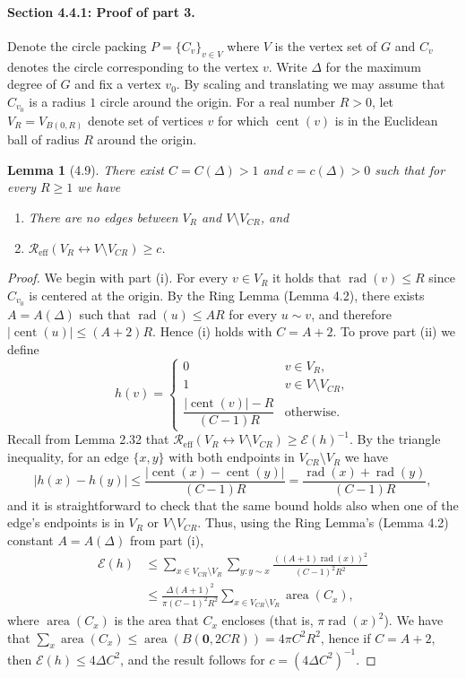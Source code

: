 \documentclass[UTF8,11pt]{ctexart}
\newtheorem*{lemma}{Lemma}
\theoremstyle{definition}
\newcommand{\Reff}{\mathcal R_{\mathrm{eff}}}
\begin{document}
\paragraph{Section 4.4.1: Proof of part 3.}
Denote the circle packing $P=\{C_v\}_{v\in V}$ where $V$ is the vertex set of $G$ and $C_v$ denotes the circle corresponding to the vertex $v$. Write $\Delta$ for the maximum degree of $G$ and fix a vertex $v_0$. By scaling and translating we may assume that $C_{v_0}$ is a radius $1$ circle around the origin. For a real number $R>0$, let $V_R=V_{B(0,R)}$ denote set of vertices $v$ for which $\operatorname{cent}(v)$ is in the Euclidean ball of radius $R$ around the origin.
\begin{lemma}[4.9]
There exist $C=C(\Delta)>1$ and $c=c(\Delta)>0$ such that for every $R\ge1$ we have
\begin{enumerate}[label=(\roman*)]
\item There are no edges between $V_R$ and $V\setminus V_{CR}$, and
\item $\Reff(V_R\leftrightarrow V\setminus V_{CR})\ge c$.
\end{enumerate}
\end{lemma}
\begin{proof}
We begin with part (i). For every $v\in V_R$ it holds that $\operatorname{rad}(v)\le R$ since $C_{v_0}$ is centered at the origin. By the Ring Lemma (Lemma 4.2), there exists $A=A(\Delta)$ such that $\operatorname{rad}(u)\le AR$ for every $u\sim v$, and therefore $|\operatorname{cent}(u)|\le(A+2)R$. Hence (i) holds with $C=A+2$.
To prove part (ii) we define
\[
h(v)=\begin{cases}
0&v\in V_R,\\1&v\in V\setminus V_{CR},\\
\dfrac{|\operatorname{cent}(v)|-R}{(C-1)R}&\text{otherwise}.
\end{cases}
\]
Recall from Lemma 2.32 that $\Reff(V_R\leftrightarrow V\setminus V_{CR})\ge\mathcal E(h)^{-1}$. By the triangle inequality, for an edge $\{x,y\}$ with both endpoints in $V_{CR}\setminus V_R$ we have
\[
|h(x)-h(y)|\le\frac{|\operatorname{cent}(x)-\operatorname{cent}(y)|}{(C-1)R}
=\frac{\operatorname{rad}(x)+\operatorname{rad}(y)}{(C-1)R},
\]
and it is straightforward to check that the same bound holds also when one of the edge's endpoints is in $V_R$ or $V\setminus V_{CR}$. Thus, using the Ring Lemma's (Lemma 4.2) constant $A=A(\Delta)$ from part (i),
\begin{align*}
\mathcal E(h)
&\le\sum_{x\in V_{CR}\setminus V_R}\sum_{y:y\sim x}
\frac{((A+1)\operatorname{rad}(x))^2}{(C-1)^2R^2}\\
&\le\frac{\Delta(A+1)^2}{\pi(C-1)^2R^2}\sum_{x\in V_{CR}\setminus V_R}\operatorname{area}(C_x),
\end{align*}
where $\operatorname{area}(C_x)$ is the area that $C_x$ encloses (that is, $\pi\operatorname{rad}(x)^2$). We have that $\sum_x\operatorname{area}(C_x)\le\operatorname{area}(B(\mathbf0,2CR))=4\pi C^2R^2$, hence if $C=A+2$, then $\mathcal E(h)\le4\Delta C^2$, and the result follows for $c=(4\Delta C^2)^{-1}$.
\end{proof}
\end{document}
